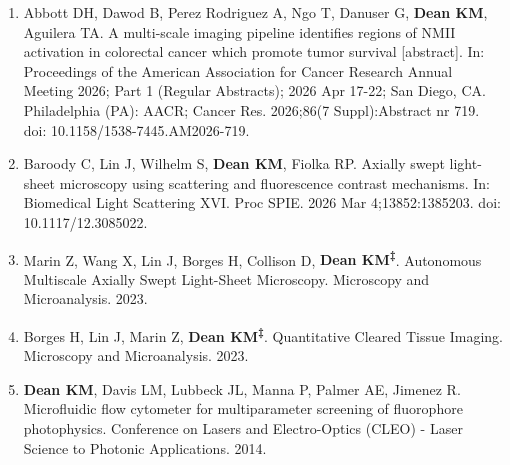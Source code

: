 \begin{enumerate}

\item Abbott DH, Dawod B, Perez Rodriguez A, Ngo T, Danuser G, \textbf{Dean KM}, Aguilera TA. A multi-scale imaging pipeline identifies regions of NMII activation in colorectal cancer which promote tumor survival [abstract]. In: Proceedings of the American Association for Cancer Research Annual Meeting 2026; Part 1 (Regular Abstracts); 2026 Apr 17-22; San Diego, CA. Philadelphia (PA): AACR; Cancer Res. 2026;86(7 Suppl):Abstract nr 719. doi: 10.1158/1538-7445.AM2026-719.

\item Baroody C, Lin J, Wilhelm S, \textbf{Dean KM}, Fiolka RP. Axially swept light-sheet microscopy using scattering and fluorescence contrast mechanisms. In: Biomedical Light Scattering XVI. Proc SPIE. 2026 Mar 4;13852:1385203. doi: 10.1117/12.3085022.

\item Marin Z, Wang X, Lin J, Borges H, Collison D, \textbf{Dean KM\textsuperscript{‡}}. Autonomous Multiscale Axially Swept Light-Sheet Microscopy. Microscopy and Microanalysis. 2023.

\item Borges H, Lin J, Marin Z, \textbf{Dean KM\textsuperscript{‡}}. Quantitative Cleared Tissue Imaging. Microscopy and Microanalysis. 2023.

\item \textbf{Dean KM}, Davis LM, Lubbeck JL, Manna P, Palmer AE, Jimenez R. Microfluidic flow cytometer for multiparameter screening of fluorophore photophysics. Conference on Lasers and Electro-Optics (CLEO) - Laser Science to Photonic Applications. 2014.

\end{enumerate}
